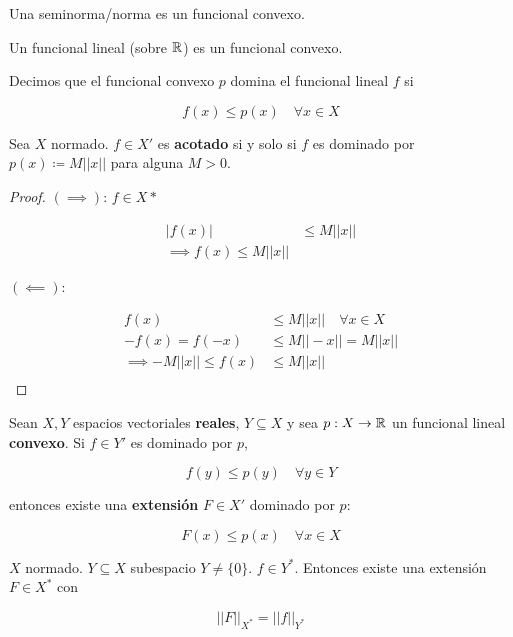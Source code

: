 \begin{fexample}
    Una seminorma/norma es un funcional convexo.
\end{fexample}

\begin{fexample}
    Un funcional lineal (sobre $\mathbb{R}$) es un funcional convexo.
\end{fexample}

\begin{fdefinition}
    Decimos que el funcional convexo $p$ domina el funcional lineal $f$ si 

\[f(x)\leq p(x)\quad\forall x\in X\]
\end{fdefinition}

\begin{fproposition}
    Sea $X$ normado. $f\in X'$ es \textbf{acotado} si y solo si $f$ es dominado por $p(x)\coloneqq M||x||$ para alguna $M>0$.
\end{fproposition}

\begin{proof}
    $(\implies)$: $f\in X*$ 

    \begin{align*}
        |f(x)|&\leq M||x||\\
        \implies f(x)\leq M||x||
    \end{align*}

    $(\impliedby)$: 

    \begin{align*}
        f(x)&\leq M||x||\quad\forall x\in X\\
        -f(x)=f(-x)&\leq M||-x||=M||x||\\
        \implies -M||x||\leq f(x)&\leq M||x||\\
    \end{align*}
\end{proof}

\begin{ftheorem}
    Sean $X,Y$ espacios vectoriales \textbf{reales}, $Y\subseteq X$ y sea $p:X\to\mathbb{R}$ un funcional lineal \textbf{convexo}. Si $f\in Y'$ es dominado por $p$,

    \[f(y)\leq p(y)\quad\forall y\in Y\]

    entonces existe una \textbf{extensión} $F\in X'$ dominado por $p$:

    \[F(x)\leq p(x)\quad\forall x\in X\]
\end{ftheorem}

\begin{fcorollary}
    $X$ normado. $Y\subseteq X$ subespacio $Y\neq \{0\}$. $f\in Y^*$. Entonces existe una extensión $F\in X^*$ con 

    \[||F||_{X^*}=||f||_{Y^*}\]
\end{fcorollary}

